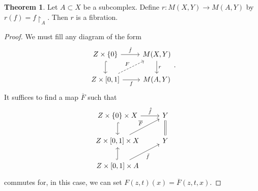 \documentclass[10pt,letterpaper,cm]{nupset}
\theoremstyle{definition}
\theoremstyle{theorem}
\newtheorem{theorem}[defn]{Theorem}
\theoremstyle{remark}
\newcommand{\1}{\mathbb{1}}
\newcommand{\0}{\vec 0}
\begin{document}
\begin{theorem}
Let $A\subset X$ be a subcomplex. Define $r: M(X, Y) \to M(A, Y)$ by $r(f) = f\restriction_A$. Then $r$ is a fibration. 
\end{theorem}
\begin{proof}
We must fill any diagram of the form
\[
\begin{tikzcd}
Z\times \left\{0\right\} \arrow[r, "\hat{f}"] \arrow[d, hook]                 & {M(X,Y)} \arrow[d, "r"] \\
{Z\times \left[0,1\right]} \arrow[ru, "F", dashed] \arrow[r, "f"'] & {M(A,Y)}               
\end{tikzcd}
.\] It suffices to find a map $\overline{F}$ such that
\[
\begin{tikzcd}
Z\times \left\{0\right\}\times X \arrow[r, "\hat{\bar{f}}"] \arrow[d, hook] & Y \arrow[d, equals] \\
{Z\times \left[0,1\right]\times X} \arrow[ru, "\overline{F}"]               & Y           \\
{Z\times \left[0,1\right]\times A} \arrow[u, hook] \arrow[ru, "\bar{f}"']   &            
\end{tikzcd}
\] commutes for, in this case, we can set $F(z,t)(x) = \overline{F}(z, t, x)$.


\end{proof}
\end{document}
